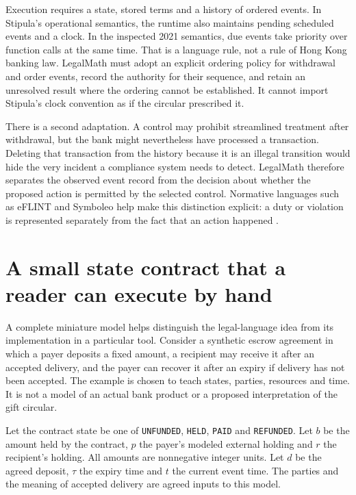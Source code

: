 \documentclass[12pt,a4paper,oneside,openany]{book}
\begin{document}
Execution requires a state, stored terms and a history of ordered events. In
Stipula's operational semantics, the runtime also maintains pending scheduled
events and a clock. In the inspected 2021 semantics, due events take priority
over function calls at the same time. That is a language rule, not a rule of
Hong Kong banking law. LegalMath must adopt an explicit ordering policy for
withdrawal and order events, record the authority for their sequence, and retain
an unresolved result where the ordering cannot be established. It cannot import
Stipula's clock convention as if the circular prescribed it.

There is a second adaptation. A control may prohibit streamlined treatment after
withdrawal, but the bank might nevertheless have processed a transaction.
Deleting that transaction from the history because it is an illegal transition
would hide the very incident a compliance system needs to detect. LegalMath
therefore separates the observed event record from the decision about whether
the proposed action is permitted by the selected control. Normative languages
such as eFLINT and Symboleo help make this distinction explicit: a duty or
violation is represented separately from the fact that an action happened
\citep{eflint2020,symboleo2020}.

\section{A small state contract that a reader can execute by hand}
\label{merge:M04:06}


A complete miniature model helps distinguish the legal-language idea from its
implementation in a particular tool. Consider a synthetic escrow agreement in
which a payer deposits a fixed amount, a recipient may receive it after an
accepted delivery, and the payer can recover it after an expiry if delivery has
not been accepted. The example is chosen to teach states, parties, resources and
time. It is not a model of an actual bank product or a proposed interpretation of
the gift circular.

Let the contract state be one of \texttt{UNFUNDED}, \texttt{HELD},
\texttt{PAID} and \texttt{REFUNDED}. Let $b$ be the amount held by the contract,
$p$ the payer's modeled external holding and $r$ the recipient's holding. All
amounts are nonnegative integer units. Let $d$ be the agreed deposit, $\tau$ the
expiry time and $t$ the current event time. The parties and the meaning of
accepted delivery are agreed inputs to this model.
\end{document}
